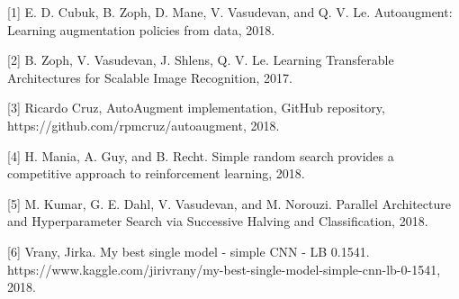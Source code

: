 \documentclass[10pt,twocolumn,letterpaper]{article}
\begin{document}
{\small



[1] E. D. Cubuk, B. Zoph, D. Mane, V. Vasudevan, and Q. V. Le. Autoaugment:   Learning  augmentation  policies  from  data, 2018. \newline

[2] B. Zoph, V. Vasudevan, J. Shlens, Q. V. Le. Learning Transferable Architectures for Scalable Image Recognition, 2017. \newline

[3] Ricardo Cruz, AutoAugment implementation, GitHub repository, https://github.com/rpmcruz/autoaugment, 2018. \newline

[4] H. Mania, A. Guy, and B. Recht. Simple random search provides a competitive approach to reinforcement learning, 2018.\newline

[5] M. Kumar, G. E. Dahl, V. Vasudevan, and M. Norouzi. Parallel Architecture and Hyperparameter Search
via Successive Halving and Classification, 2018.\newline

[6] Vrany, Jirka. My best single model - simple CNN - LB 0.1541. https://www.kaggle.com/jirivrany/my-best-single-model-simple-cnn-lb-0-1541, 2018.\newline


}
\end{document}

